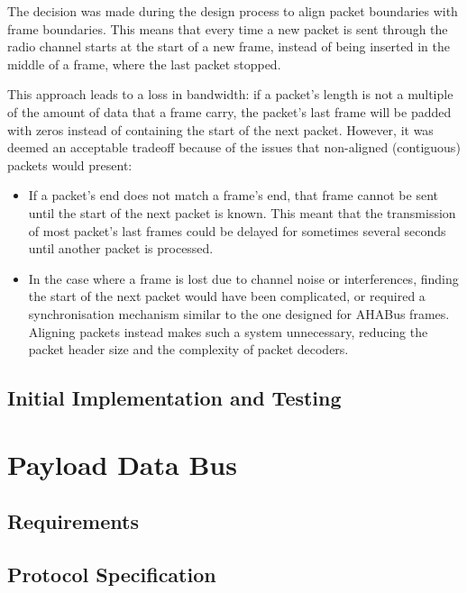 
The decision was made during the design process to align packet boundaries with
frame boundaries. This means that every time a new packet is sent through the
radio channel starts at the start of a new frame, instead of being inserted
in the middle of a frame, where the last packet stopped.

This approach leads to a loss in bandwidth: if a packet's length is not a 
multiple of the amount of data that a frame carry, the packet's last frame
will be padded with zeros instead of containing the start of the next packet.
However, it was deemed an acceptable tradeoff because of the issues that
non-aligned (contiguous) packets would present:

\begin{itemize}
\item If a packet's end does not match a frame's end, that frame cannot be
sent until the start of the next packet is known. This meant that the
transmission of most packet's last frames could be delayed for sometimes several
seconds until another packet is processed.

\item In the case where a frame is lost due to channel noise or interferences,
finding the start of the next packet would have been complicated, or required
a synchronisation mechanism similar to the one designed for AHABus frames.
Aligning packets instead makes such a system unnecessary, reducing the packet
header size and the complexity of packet decoders.
\end{itemize}


\subsection{Initial Implementation and Testing}

\section{Payload Data Bus}

\subsection{Requirements}

\subsection{Protocol Specification}

